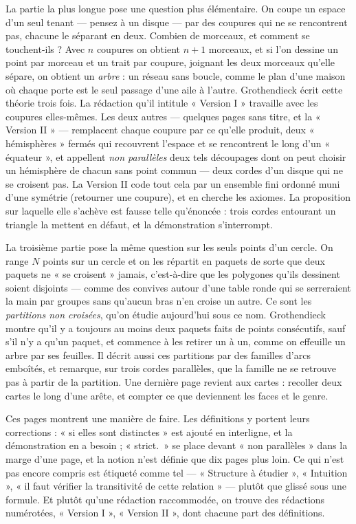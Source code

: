 \documentclass[11pt,a4paper]{article}
\begin{document}
\begin{resume}
La partie la plus longue pose une question plus élémentaire. On coupe un
espace d'un seul tenant --- pensez à un disque --- par des coupures qui ne se
rencontrent pas, chacune le séparant en deux. Combien de morceaux, et
comment se touchent-ils ? Avec $n$ coupures on obtient $n+1$ morceaux, et si
l'on dessine un point par morceau et un trait par coupure, joignant les deux
morceaux qu'elle sépare, on obtient un \emph{arbre} : un réseau sans boucle,
comme le plan d'une maison où chaque porte est le seul passage d'une aile à
l'autre. Grothendieck écrit cette théorie trois fois. La rédaction qu'il
intitule « Version I » travaille avec les coupures elles-mêmes. Les deux
autres --- quelques pages sans titre, et la « Version II » --- remplacent
chaque coupure par ce qu'elle produit, deux « hémisphères » fermés
qui recouvrent l'espace et se rencontrent le long d'un « équateur », et
appellent \emph{non parallèles} deux tels découpages dont on peut choisir un
hémisphère de chacun sans point commun --- deux cordes d'un disque qui ne se
croisent pas. La Version II code tout cela par un ensemble fini
ordonné muni d'une symétrie (retourner une coupure), et en cherche les
axiomes. La proposition sur laquelle elle s'achève est fausse telle
qu'énoncée : trois cordes entourant un triangle la mettent en défaut, et la
démonstration s'interrompt.

La troisième partie pose la même question sur les seuls points d'un cercle.
On range $N$ points sur un cercle et on les répartit en paquets de sorte que
deux paquets ne « se croisent » jamais, c'est-à-dire que les polygones qu'ils
dessinent soient disjoints --- comme des convives autour d'une table ronde qui
se serreraient la main par groupes sans qu'aucun bras n'en croise un autre.
Ce sont les \emph{partitions non croisées}, qu'on étudie aujourd'hui sous ce
nom. Grothendieck montre qu'il y a toujours au moins deux paquets faits de
points consécutifs, sauf s'il n'y a qu'un paquet, et commence à les retirer
un à un, comme on effeuille un arbre par ses feuilles. Il décrit aussi ces
partitions par des familles d'arcs emboîtés, et remarque, sur trois cordes
parallèles, que la famille ne se retrouve pas à partir de la partition. Une
dernière page revient aux cartes : recoller deux cartes le long d'une arête,
et compter ce que deviennent les faces et le genre.

Ces pages montrent une manière de faire. Les définitions y portent leurs
corrections : « si elles sont distinctes » est ajouté en interligne, et la
démonstration en a besoin ; « strict.\ » se place devant « non
parallèles » dans la marge d'une page, et la notion n'est définie que dix
pages plus loin. Ce qui n'est pas encore compris est étiqueté comme tel ---
« Structure à étudier », « Intuition », « il faut vérifier la transitivité de cette relation » --- plutôt que glissé sous une formule. Et plutôt qu'une
rédaction raccommodée, on trouve des rédactions numérotées, « Version I »,
« Version II », dont chacune part des définitions.


\end{resume}
\end{document}
